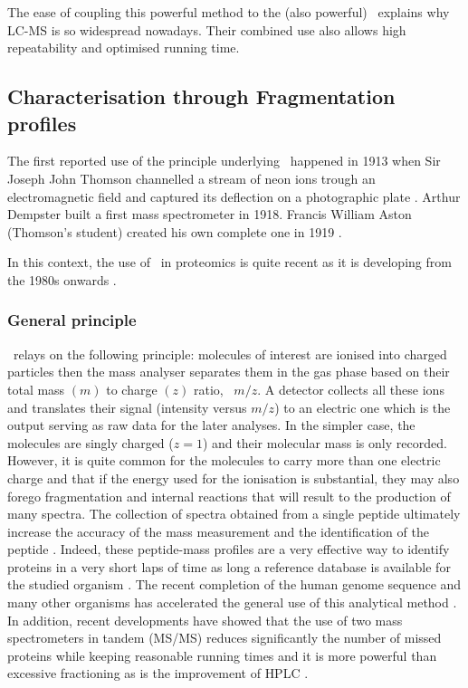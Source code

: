 The ease of coupling this powerful method to the (also powerful) \ms\ explains
why \gls{LC-MS} is so widespread nowadays. Their combined use also allows high
repeatability and optimised running time.

\subsection{Characterisation through Fragmentation profiles}

The first reported use of the principle underlying \ms\ happened in 1913 when
Sir Joseph John Thomson channelled a stream of neon ions trough an electromagnetic
field and captured its deflection on a photographic plate .
Arthur Dempster built a first mass spectrometer in 1918. Francis  William
Aston (Thomson's student) created his own complete one in 1919 .
\begin{comment}
\ms\ became rapidly a pillar
of the so-called \emph{modern analytical techniques} in Chemistry as it allows
for a large spectrum of molecules of interest, the detection,
the characterisation and even, for the smaller ones, the resolution of their
structures.
\end{comment}
In this context, the use of \ms\ in proteomics is quite recent as it
is developing from the 1980s onwards .

\subsubsection{General principle}

\ms\ relays on the following principle: molecules of interest are ionised
into charged particles then the mass analyser separates them in the gas phase
based on their total mass $(m)$ to charge $(z)$ ratio, \ie\ $m/z$.
A detector collects all these ions and translates their signal (intensity versus
$m/z$) to an electric one which is the output serving as raw data for the
later analyses. In the simpler case, the molecules are singly charged ($z=1$) and
their molecular mass is only recorded. However, it is quite common for the
molecules to carry more than one electric charge and that if the energy used for
the ionisation is substantial, they may also forego fragmentation and internal
reactions that will result to the production of many spectra. The collection
of spectra obtained from a single peptide ultimately increase the accuracy of
the mass measurement and the identification of the peptide .
Indeed, these peptide-mass profiles are a very effective way to identify
proteins in a very short laps of time as long a reference database is available
for the studied organism . The recent completion of the human
genome sequence and many other organisms has accelerated the general use of this
analytical method . In addition, recent developments have
showed that the use of two mass spectrometers in tandem (\gls{MS/MS}) reduces
significantly the number of missed proteins while keeping reasonable running
times and it is more powerful than excessive fractioning as is the improvement
of \gls{HPLC} .

